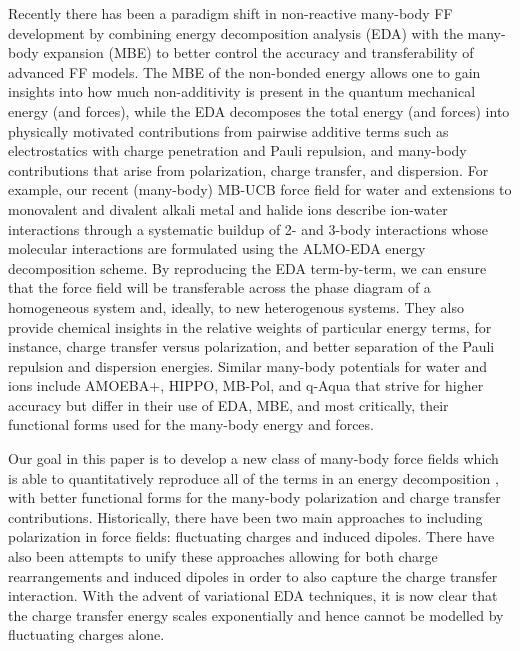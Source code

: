 \documentclass[journal=jctcce,manuscript=article]{achemso}
\begin{document}
Recently there has been a paradigm shift in non-reactive many-body FF development by combining energy decomposition analysis (EDA)\cite{Kitaura1976} with the many-body expansion (MBE)\cite{heindel2020many} to better control the accuracy and transferability of advanced FF models. The MBE of the non-bonded  energy\cite{heindel2020many} allows one to gain insights into how much non-additivity is present in the quantum mechanical energy (and forces), while the EDA decomposes the total energy (and forces) into physically motivated contributions from pairwise additive terms such as electrostatics with charge penetration and Pauli repulsion, and many-body contributions that arise from polarization, charge transfer, and dispersion. For example, our recent (many-body) MB-UCB force field for water\cite{das2019development} and extensions to monovalent and divalent alkali metal and halide ions\cite{} describe ion-water interactions through a systematic buildup of 2- and 3-body interactions whose molecular interactions are formulated using the ALMO-EDA energy decomposition scheme.\cite{mao2021intermolecular} By reproducing the EDA term-by-term, we can ensure that the force field will be transferable across the phase diagram of a homogeneous system and, ideally, to new heterogenous systems. They also provide chemical insights in the relative weights of particular energy terms, for instance, charge transfer versus polarization, and better separation of the Pauli repulsion and dispersion energies. Similar many-body potentials for water and ions include AMOEBA+, HIPPO\cite{rackers2021polarizable}, MB-Pol, and q-Aqua that strive for higher accuracy but differ in their use of EDA, MBE, and most critically, their functional forms used for the many-body energy and forces.

Our goal in this paper is to develop a new class of many-body force fields which is able to quantitatively reproduce all of the terms in an energy decomposition \cite{horn2016probing,mao2021intermolecular}, with better functional forms for the many-body polarization and charge transfer contributions. Historically, there have been two main approaches to including polarization in force fields: fluctuating charges\cite{rick1994dynamical} and induced dipoles\cite{applequist1985multipole}. There have also been attempts to unify these approaches allowing for both charge rearrangements and induced dipoles\cite{stern2001combined} in order to also capture the charge transfer interaction.\cite{rick1994dynamical} With the advent
of variational EDA  techniques\cite{horn2016probing,mao2021intermolecular},
it is now clear that the charge transfer energy scales exponentially and hence
cannot be modelled by fluctuating charges alone.
\end{document}
